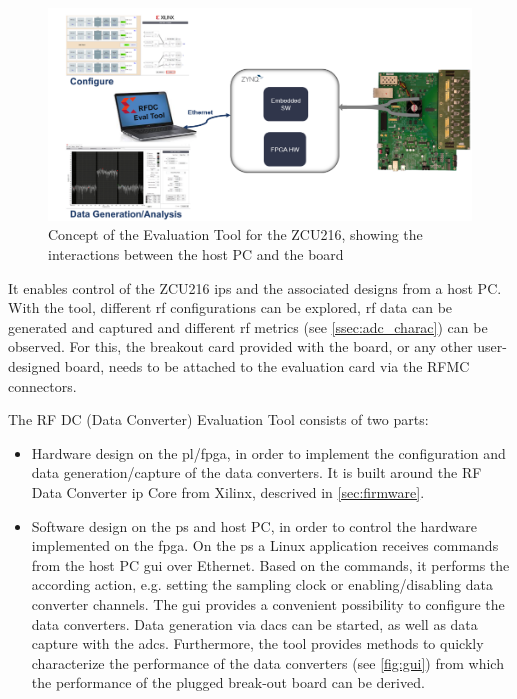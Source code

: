 \begin{figure}[tbh]
	\centering
	\includegraphics[width = \textwidth]{chap/05-readout/img/zcu216evaltool}
	\caption[ZCU216 Evaluation Tool]{Concept of the Evaluation Tool for the ZCU216, showing the interactions between the host PC and the board}
	\label{fig:evalTool}
\end{figure}

It enables control of the ZCU216 \glspl{ip} and the associated designs from a host PC. 
With the tool, different \gls{rf} configurations can be explored, \gls{rf} data can be generated and captured and different \gls{rf} metrics (see \autoref{ssec:adc_charac}) can be observed.  
For this, the breakout card provided with the board, or any other user-designed board, needs to be attached to the evaluation card via the RFMC connectors. %

The RF DC (Data Converter) Evaluation Tool consists of two parts:
\begin{itemize}
	\item Hardware design on the \gls{pl}/\gls{fpga}, in order to implement the configuration and data generation/capture of the data converters.
	It is built around the RF Data Converter \gls{ip} Core from Xilinx, descrived in \autoref{sec:firmware}.
	\item Software design on the \gls{ps} and host PC, in order to control the hardware implemented on the \gls{fpga}.
	On the \gls{ps} a Linux application receives commands from the host PC \gls{gui} over Ethernet.
	Based on the commands, it performs the according action, e.g. setting the sampling clock or enabling/disabling data converter channels.
	The \gls{gui} provides a convenient possibility to configure the data converters.
	Data generation via \glspl{dac} can be started, as well as data capture with the \glspl{adc}.
	Furthermore, the tool provides methods to quickly characterize the performance of the data converters (see \autoref{fig:gui}) from which the performance of the plugged break-out board can be derived.
\end{itemize}



